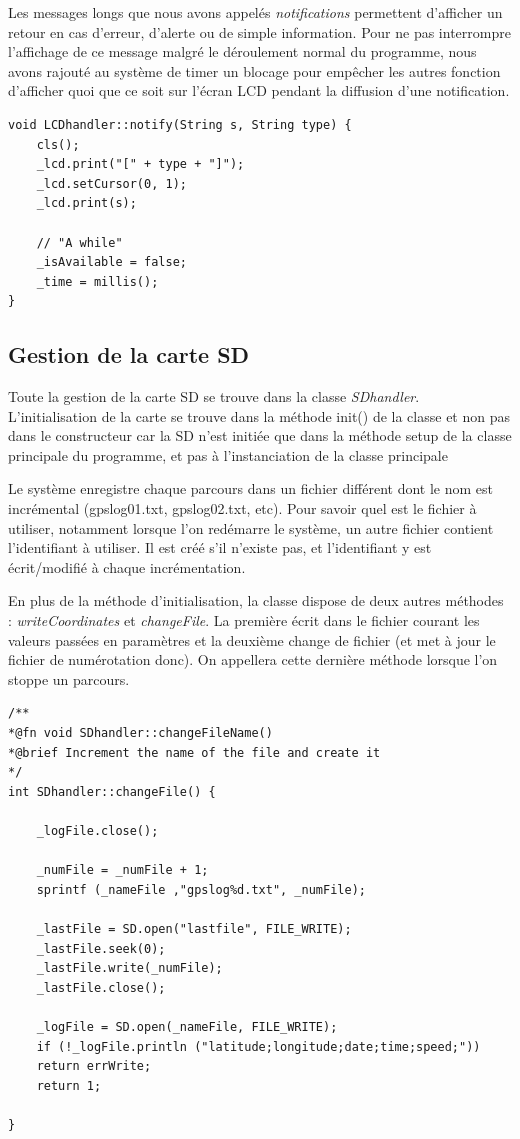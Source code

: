 \documentclass[a4paper,12pt,titlepage]{article}
\begin{document}
Les messages longs que nous avons appelés \emph{notifications} permettent
d'afficher un retour en cas d'erreur, d'alerte ou de simple information. Pour
ne pas interrompre l'affichage de ce message malgré le déroulement normal du
programme, nous avons rajouté au système de timer un blocage pour empêcher les
autres fonction d'afficher quoi que ce soit sur l'écran LCD pendant la diffusion
d'une notification.

\begin{lstlisting}[caption={notify}, label={notify}]
void LCDhandler::notify(String s, String type) {
    cls();
    _lcd.print("[" + type + "]");
    _lcd.setCursor(0, 1);
    _lcd.print(s);

    // "A while"
    _isAvailable = false;
    _time = millis();
}

\end{lstlisting}

\subsection{Gestion de la carte SD}

Toute la gestion de la carte SD se trouve dans la classe \emph{SDhandler}.
L'initialisation de la carte se trouve dans la méthode init() de la classe et
non pas dans le constructeur car la SD n'est initiée que dans la méthode setup
de la classe principale du programme, et pas à l'instanciation de la classe
principale

Le système enregistre chaque parcours dans un fichier différent dont le nom est
incrémental (gpslog01.txt, gpslog02.txt, etc).
Pour savoir quel est le fichier à utiliser, notamment lorsque l'on redémarre
le système, un autre fichier contient l'identifiant à utiliser.
Il est créé s'il n'existe pas, et l'identifiant y est écrit/modifié à chaque
incrémentation.

En plus de la méthode d'initialisation, la classe dispose de deux autres
méthodes : \emph{writeCoordinates} et \emph{changeFile}. La première écrit
dans le fichier courant les valeurs passées en paramètres et la deuxième
change de fichier (et met à jour le fichier de numérotation donc).
On appellera cette dernière méthode lorsque l'on stoppe un parcours.

\begin{lstlisting}[caption={changeFile}, label={changeFile}]
/**
*@fn void SDhandler::changeFileName()
*@brief Increment the name of the file and create it
*/
int SDhandler::changeFile() {

    _logFile.close();

    _numFile = _numFile + 1;
    sprintf (_nameFile ,"gpslog%d.txt", _numFile);

    _lastFile = SD.open("lastfile", FILE_WRITE);
    _lastFile.seek(0);
    _lastFile.write(_numFile);
    _lastFile.close();

    _logFile = SD.open(_nameFile, FILE_WRITE);
    if (!_logFile.println ("latitude;longitude;date;time;speed;"))
    return errWrite;
    return 1;

}
\end{lstlisting}
\end{document}
